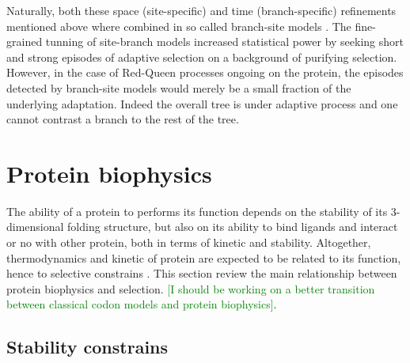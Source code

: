 Naturally, both these space (site-specific) and time (branch-specific) refinements mentioned above where combined in so called branch-site models \citep{Yang2002, Zhang2004, Pond2011}.
The fine-grained tunning of site-branch models increased statistical power by seeking short and strong episodes of adaptive selection on a background of purifying selection.
However, in the case of Red-Queen processes ongoing on the protein, the episodes detected by branch-site models would merely be a small fraction of the underlying adaptation.
Indeed the overall tree is under adaptive process and one cannot contrast a branch to the rest of the tree.

%


\section{Protein biophysics}

The ability of a protein to performs its function depends on the stability of its 3-dimensional folding structure, but also on its ability to bind ligands and interact or no with other protein, both in terms of kinetic and stability.
Altogether, thermodynamics and kinetic of protein are expected to be related to its function, hence to selective constrains \citep{Bastolla2017}.
This section review the main relationship between protein biophysics and selection.
\textcolor{GREEN}{[I should be working on a better {transition} between classical \gls{codon} models and protein biophysics]}.
\subsection{Stability constrains}


